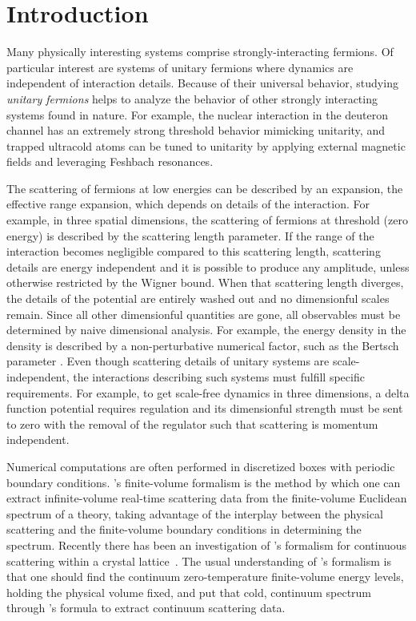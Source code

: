 \section{Introduction}\label{sec:intro}

Many physically interesting systems comprise strongly-interacting fermions.
Of particular interest are systems of unitary fermions where dynamics are independent of interaction details.
Because of their universal behavior, studying \emph{unitary fermions} helps to analyze the behavior of other strongly interacting systems found in nature.
For example, the nuclear interaction in the deuteron channel has an extremely strong threshold behavior mimicking unitarity, and trapped ultracold atoms can be tuned to unitarity by applying external magnetic fields and leveraging Feshbach resonances.

The scattering of fermions at low energies can be described by an expansion, the effective range expansion, which depends on details of the interaction.
For example, in three spatial dimensions, the scattering of fermions at threshold (zero energy) is described by the scattering length parameter.
If the range of the interaction becomes negligible compared to this scattering length, scattering details are energy independent and it is possible to produce any amplitude, unless otherwise restricted by the Wigner bound\cite{Wigner:1955zz, Phillips:1996ae, Hammer:2010fw}.
When that scattering length diverges, the details of the potential are entirely washed out and no dimensionful scales remain.
Since all other dimensionful quantities are gone, all observables must be determined by naive dimensional analysis.
For example, the energy density in the density is described by a non-perturbative numerical factor, such as the Bertsch parameter\cite{PhysRevC.60.054311} .
Even though scattering details of unitary systems are scale-independent, the interactions describing such systems must fulfill specific requirements.
For example, to get scale-free dynamics in three dimensions, a delta function potential requires regulation and its dimensionful strength must be sent to zero with the removal of the regulator such that scattering is momentum independent.

Numerical computations are often performed in discretized boxes with periodic boundary conditions.
\Luscher's finite-volume formalism\cite{Hamber198399,luscher:1986I,luscher:1986II,wiese1989,Luscher1991,Luscher1991237} is the method by which one can extract infinite-volume real-time scattering data from the finite-volume Euclidean spectrum of a theory, taking advantage of the interplay between the physical scattering and the finite-volume boundary conditions in determining the spectrum.  Recently there has been an investigation of \Luscher's formalism for continuous scattering within a crystal lattice~\cite{Valiente:2015oya}.
The usual understanding of \Luscher's formalism is that one should find the continuum zero-temperature finite-volume energy levels, holding the physical volume fixed, and put that cold, continuum spectrum through \Luscher's formula to extract continuum scattering data.

